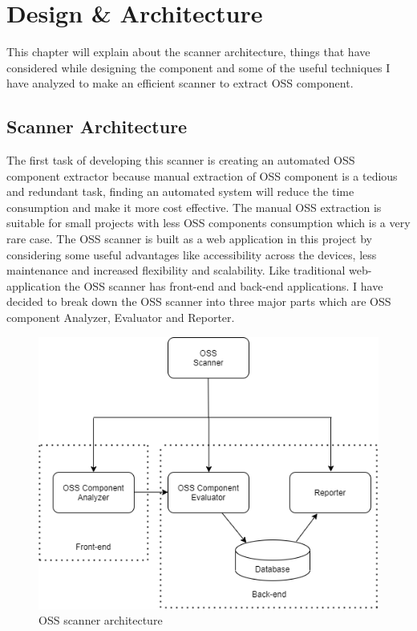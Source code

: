 %
\section{Design \& Architecture}\label{sec:design_architecture}
%
This chapter will explain about the scanner architecture, things that have considered while designing the component and some of the useful techniques I have analyzed to make an efficient scanner to extract \acs{OSS} component.

\subsection{Scanner Architecture}
 The first task of developing this scanner is creating an automated \acs{OSS} component extractor because manual extraction of \acs{OSS} component is a tedious and redundant task, finding an automated system will reduce the time consumption and make it more cost effective. The manual \acs{OSS} extraction is suitable for small projects with less \acs{OSS} components consumption which is a very rare case. The \acs{OSS} scanner is built as a web application in this project by considering some useful advantages like accessibility across the devices, less maintenance and increased flexibility and scalability. Like traditional web-application the \acs{OSS} scanner has front-end and back-end applications. I have decided to break down the \acs{OSS} scanner into three major parts which are \acs{OSS} component Analyzer, Evaluator and Reporter. 
 \begin{figure}[h!]
 	\includegraphics[width=15cm]{includes/architetcure.png}
 	\centering
 	\caption{\acs{OSS} scanner architecture}
 	\label{fig:architecture}
 \end{figure}
